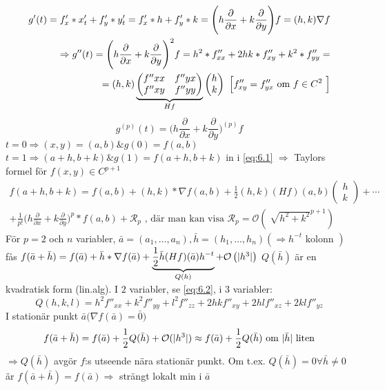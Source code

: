 \documentclass{article}
\DeclarePairedDelimiter \abs{\lvert}{\rvert}
\let\oldsqrt\sqrt
\renewcommand*{\sqrt}[2][\ ]{\oldsqrt[#1]{#2} }
\begin{document}
\[
\begin{split}
g'(t) = f'_x * x'_t + f'_y * y'_t = f'_x * h + f'_y * k = \Bigg( h\frac{\partial}{\partial x} + k\frac{\partial}{\partial y} \Bigg)f = (h,k) \nabla f \\
\Rightarrow g''(t) = \Bigg( h\frac{\partial}{\partial x} + k\frac{\partial}{\partial y} \Bigg)^2 f = h^2*f''_{xx} + 2hk*f''_{xy} + k^2*f''_{yy} = \\
= (h,k)
\underbrace{\begin{pmatrix}
	f''{xx} & f''{yx} \\
	f''{xy} & f''{yy} \\
\end{pmatrix}}_{Hf}
\begin{pmatrix}
	h \\
	k
\end{pmatrix}
\text{ \Big[$f''_{xy} = f''_{yx}$ om $f \in C^2$ \Big]}
\end{split}
\]
\begin{equation} \label{eq:6.2}
g^{(p)}(t) = \Bigg( h\frac{\partial}{\partial x} + k\frac{\partial}{\partial y} \Bigg)^{(p)} f
\end{equation}
$t = 0 \Rightarrow (x,y) = (a,b) \& g(0) = f(a,b)$ \newline
$t = 1 \Rightarrow (a+h,b+k) \& g(1) = f(a+h,b+k)$ in i \vref{eq:6.1}
$\Rightarrow$ Taylors formel för $f(x,y) \in C^{p+1}$
\[
\begin{split}
	f(a+h,b+k) = f(a,b) + (h,k) * \nabla f(a,b) + \frac{1}{2}(h,k)(Hf)(a,b)
	\begin{pmatrix}
		h \\
		k
	\end{pmatrix}
	+ \cdots \\
	+ \frac{1}{p!}\Big(h\frac{\partial}{\partial x} + k\frac{\partial}{\partial y})^p * f(a,b) + \mathcal{R}_p \text{ , där man kan visa } \mathcal{R}_p = \mathcal{O}\left(\sqrt{h^2 + k^2}^{p+1}\right)
\end{split}
\]
För $p=2$ och $n$ variabler, $\bar{a} = (a_1, \ldots ,a_n) , \bar{h} = (h_1, \ldots ,h_n) \left(\Rightarrow h^{-t} \text{ kolonn } \right)$ fås 
$f(\bar{a}+\bar{h}) = f(\bar{a}) + \bar{h} * \nabla f(\bar{a}) + \underbrace{\frac{1}{2}\bar{h}(Hf)(\bar{a})h^{-t}}_{Q(h)} + \mathcal{O}\left(\abs{h^3}\right)$
\newpage
$Q(\bar{h})$ är en kvadratisk form (lin.alg). I $2$ variabler, se \eqref{eq:6.2}, i $3$ variabler:
$$
	Q(h,k,l) = h^2f''_{xx} + k^2f''_{yy} + l^2f''_{zz} + 2hkf''_{xy} + 2hlf''_{xz} + 2klf''_{yz}
$$
I stationär punkt $\bar{a} \Big(\nabla f(\bar{a}) = \bar{0}\Big)$
$$
	f(\bar{a}+\bar{h}) = f(\bar{a}) + \frac{1}{2}Q(\bar{h}) + \mathcal{O}(\abs{h^3}) \approx f(\bar{a}) + \frac{1}{2}Q(\bar{h}) \text{ om } \abs{\bar{h}} \text{ liten}
$$
$\Rightarrow Q(\bar{h})$ avgör $f$:s utseende nära stationär punkt. \newline Om t.ex. $Q(\bar{h}) = 0 \forall \bar{h} \neq 0$ är $f(\bar{a}+\bar{h}) = f(\bar{a}) \Rightarrow$ strängt lokalt min i $\bar{a}$
\end{document}
